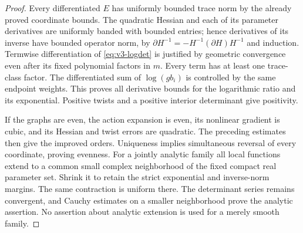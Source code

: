 \begin{proof}
Every differentiated $E$ has uniformly bounded trace norm by the
already proved coordinate bounds. The quadratic Hessian and each of
its parameter derivatives are uniformly banded with bounded entries;
hence derivatives of its inverse have bounded operator norm, by
$\partial H^{-1}=-H^{-1}(\partial H)H^{-1}$ and induction.
Termwise differentiation of \eqref{eq:v3-logdet} is justified by
geometric convergence even after its fixed polynomial factors in $m$.
Every term has at least one trace-class factor. The differentiated sum
of $\log(gb_i)$ is controlled by the same endpoint weights. This proves
all derivative bounds for the logarithmic ratio and its exponential.
Positive twists and a positive interior determinant give positivity.

If the graphs are even, the action expansion is even, its nonlinear
gradient is cubic, and its Hessian and twist errors are quadratic.
The preceding estimates then give the improved orders. Uniqueness
implies simultaneous reversal of every coordinate, proving evenness.
For a jointly analytic family all local functions extend to a common
small complex neighborhood of the fixed compact real parameter set.
Shrink it to retain the strict exponential and inverse-norm margins.
The same contraction is uniform there. The determinant series remains
convergent, and Cauchy estimates on a smaller neighborhood prove the
analytic assertion. No assertion about analytic extension is used for
a merely smooth family.
\end{proof}

